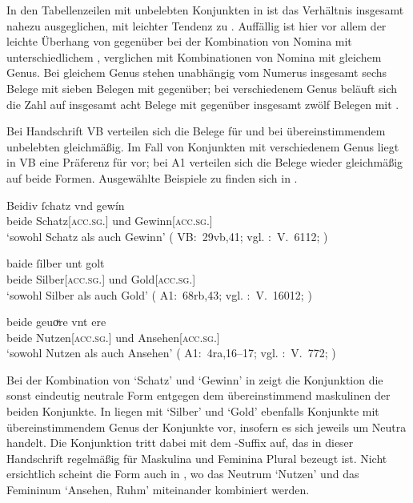 In den Tabellenzeilen mit unbelebten Konjunkten in
 ist das Verhältnis insgesamt nahezu ausgeglichen,
mit leichter Tendenz zu . Auffällig ist hier vor allem der leichte
Überhang von  gegenüber  bei der Kombination von
Nomina mit unterschiedlichem , verglichen mit Kombinationen von
Nomina mit gleichem Genus. Bei gleichem Genus stehen unabhängig vom Numerus
insgesamt sechs Belege mit  sieben Belegen mit
 gegenüber; bei verschiedenem Genus beläuft sich die Zahl auf
insgesamt acht Belege mit  gegenüber insgesamt zwölf Belegen mit
.

Bei Handschrift VB verteilen sich die Belege für  und
 bei übereinstimmendem unbelebten 
gleichmäßig. Im Fall von Konjunkten mit verschiedenem Genus liegt in VB
eine Präferenz für  vor; bei A1 verteilen sich die Belege wieder
gleichmäßig auf beide Formen. Ausgewählte Beispiele zu 
finden sich in .

\begin{exe}
\ex \label{ex:konjbeidirreginan}
	\begin{xlist}
	\ex \gll Beidiv ſchatz vnd gewín \\
			beide Schatz[\textsc{acc.sg.\MascI}] und Gewinn[\textsc{acc.sg.\MascI}] \\
		\trans `sowohl Schatz als auch Gewinn'
			(%
				VB:~29vb,41; vgl.
				\KC:~V.~6112;
				\cite[194]{schroeder1895}%
			)
		\label{ex:konjbeidirreginan_1}

	\ex \gll baide ſilber unt golt \\
			beide Silber[\textsc{acc.sg.\NeutI}] und Gold[\textsc{acc.sg.\NeutI}] \\
		\trans `sowohl Silber als auch Gold'
			(%
				A1:~68rb,43; vgl.
				\KC:~V.~16012;
				\cite[370]{schroeder1895}%
			)
		\label{ex:konjbeidirreginan_2}

	\ex \gll beide geuoͮre vnt ere \\
			beide Nutzen[\textsc{acc.sg.\NeutI}] und Ansehen[\textsc{acc.sg.\FemI}] \\
		\trans `sowohl Nutzen als auch Ansehen'
			(%
				A1:~4ra,16--17; vgl.
				\KC:~V.~772;
				\cite[95]{schroeder1895}%
			)
		\label{ex:konjbeidirreginan_3}
	\end{xlist}
\end{exe}

Bei der Kombination von  `Schatz' und  `Gewinn' in
 zeigt die Konjunktion die sonst eindeutig neutrale
Form entgegen dem übereinstimmend maskulinen  der beiden Konjunkte.
In  liegen mit  `Silber' und 
`Gold' ebenfalls Konjunkte mit übereinstimmendem Genus der Konjunkte vor,
insofern es sich jeweils um Neutra handelt. Die Konjunktion tritt dabei mit dem
-Suffix auf, das in dieser Handschrift regelmäßig für Maskulina und
Feminina Plural bezeugt ist. Nicht ersichtlich scheint die Form 
auch in , wo das Neutrum  `Nutzen' und
das Femininum  `Ansehen, Ruhm' miteinander kombiniert werden.


